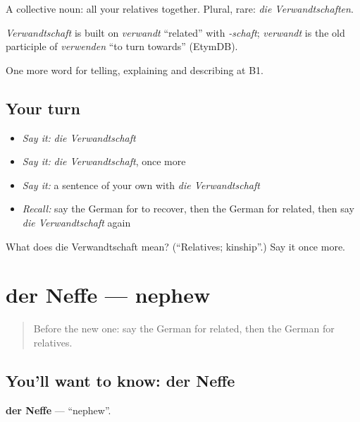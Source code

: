 A collective noun: all your relatives together. Plural, rare: \emph{die Verwandtschaften}.

\begin{cousinweb}
\emph{Verwandtschaft} is built on \emph{verwandt} \textquotedblleft{}related\textquotedblright{} with \emph{-schaft}; \emph{verwandt} is the old participle of \emph{verwenden} \textquotedblleft{}to turn towards\textquotedblright{} (EtymDB).
\end{cousinweb}

\begin{grammarlens}[title={What you've built}]
One more word for telling, explaining and describing at B1.
\end{grammarlens}

\subsection*{Your turn}
\begin{itemize}
\raggedright
  \item \emph{Say it:} \emph{die Verwandtschaft}
  \item \emph{Say it:} \emph{die Verwandtschaft}, once more
  \item \emph{Say it:} a sentence of your own with \emph{die Verwandtschaft}
  \item \emph{Recall:} say the German for to recover, then the German for related, then say \emph{die Verwandtschaft} again
\end{itemize}

\begin{tcolorbox}[breakable,colback=teal!4,colframe=teal!35!black,title={Before you move on}]
What does die Verwandtschaft mean? (\textquotedblleft{}Relatives; kinship\textquotedblright{}.) Say it once more.
\end{tcolorbox}
\section[der Neffe]{der Neffe — nephew}

\label{lesson:GE-C489-neffe}



\begin{quote}
Before the new one: say the German for related, then the German for relatives.
\end{quote}

\subsection*{You'll want to know: der Neffe}
\textbf{der Neffe} — \textquotedblleft{}nephew\textquotedblright{}.

